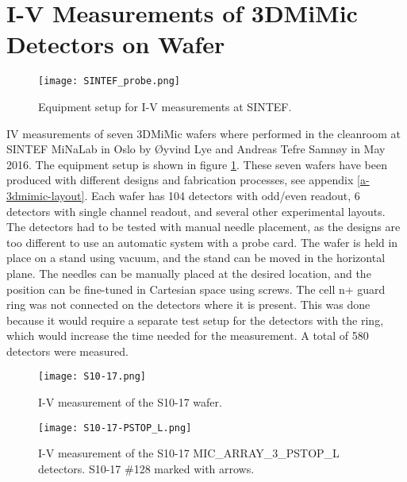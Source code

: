 \documentclass[../main/thesis.tex]{subfiles}
\begin{document}
\section{I-V Measurements of 3DMiMic Detectors on Wafer}
\label{3d-IV}

\begin{figure}%
	\centering
	\texttt{[image: SINTEF\_probe.png]}
	\caption{Equipment setup for I-V measurements at SINTEF. \citep{Yashika}}
	\label{fig-3d-probe} 
\end{figure}

\gls{IV} measurements of seven 3DMiMic wafers where performed in the cleanroom at SINTEF MiNaLab in Oslo by Øyvind Lye and Andreas Tefre Samnøy in May 2016. The equipment setup is shown in figure \ref{fig-3d-probe}. These seven wafers have been produced with different designs and fabrication processes, see appendix \ref{a-3dmimic-layout}. Each wafer has 104 detectors with odd/even readout, 6 detectors with single channel readout, and several other experimental layouts. The detectors had to be tested with manual needle placement, as the designs are too different to use an automatic system with a probe card. The wafer is held in place on a stand using vacuum, and the stand can be moved in the horizontal plane. The needles can be manually placed at the desired location, and the position can be fine-tuned in Cartesian space using screws. The cell n+ guard ring was not connected on the detectors where it is present. This was done because it would require a separate test setup for the detectors with the ring, which would increase the time needed for the measurement. A total of 580 detectors were measured. 

\begin{figure}%
	\centering
	\texttt{[image: S10-17.png]}
	\caption{I-V measurement of the S10-17 wafer. }
	\label{fig-3d-S10-17} 
\end{figure}

\begin{figure}%
	\centering
	\texttt{[image: S10-17-PSTOP\_L.png]}
	\caption{I-V measurement of the S10-17 MIC\_ARRAY\_3\_PSTOP\_L detectors. S10-17 \#128 marked with arrows.}
	\label{fig-3d-S10-17-PSTOP_L} 
\end{figure}
\end{document}
